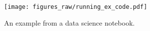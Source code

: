 \begin{figure}
\ncp\ncp
 \centering
  \texttt{[image: figures\_raw/running\_ex\_code.pdf]}
  \ncp\ncp\ncp\ncp\ncp
  \caption{An example from a data science notebook. 
  }
  \label{running_ex}
  \ncp\ncp\ncp\ncp\ncp\ncp
\end{figure}